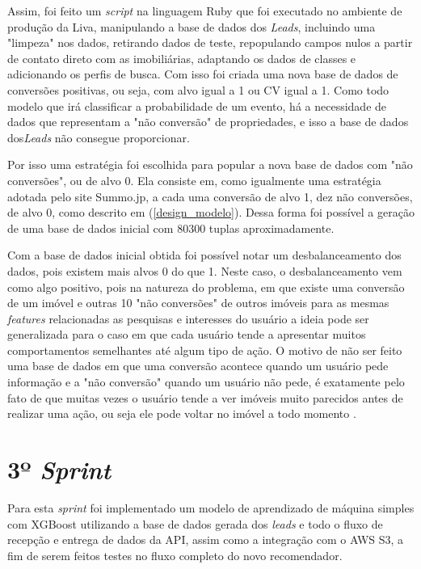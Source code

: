 Assim, foi feito um \textit{script} na linguagem Ruby que foi executado no ambiente de produção da Liva, manipulando a base de dados dos \textit{Leads}, incluindo uma "limpeza" nos dados, retirando dados de teste, repopulando campos nulos a partir de contato direto com as imobiliárias, adaptando os dados de classes e adicionando os perfis de busca. Com isso foi criada uma nova base de dados de conversões positivas, ou seja, com alvo igual a 1 ou CV igual a 1. Como todo modelo que irá classificar a probabilidade de um evento, há a necessidade de dados que representam a "não conversão" de propriedades, e isso a base de dados dos\textit{Leads} não consegue proporcionar.

Por isso uma estratégia foi escolhida para popular a nova base de dados com "não conversões", ou de alvo 0. Ela consiste em, como igualmente uma estratégia adotada pelo site Summo.jp, a cada uma conversão de alvo 1, dez não conversões, de alvo 0, como descrito em (\ref{design_modelo}). Dessa forma foi possível a geração de uma base de dados inicial com 80300 tuplas aproximadamente.

Com a base de dados inicial obtida foi possível notar um desbalanceamento dos dados, pois existem mais alvos 0 do que 1. Neste caso, o desbalanceamento vem como algo positivo, pois na natureza do problema, em que existe uma conversão de um imóvel e outras 10 "não conversões" de outros imóveis para as mesmas \textit{features} relacionadas as pesquisas e interesses do usuário a ideia pode ser generalizada para o caso em que cada usuário tende a apresentar muitos comportamentos semelhantes até algum tipo de ação. O motivo de não ser feito uma base de dados em que uma conversão acontece quando um usuário pede informação e a "não conversão" quando um usuário não pede, é exatamente pelo fato de que muitas vezes o usuário tende a ver imóveis muito parecidos antes de realizar uma ação, ou seja ele pode voltar no imóvel a todo momento \cite{Summo:2017}.


\section{3º \textit{Sprint}}

Para esta \textit{sprint} foi implementado um modelo de aprendizado de máquina simples com XGBoost utilizando a base de dados gerada dos \textit{leads} e todo o fluxo de recepção e entrega de dados da API, assim como a integração com o AWS S3, a fim de serem feitos testes no fluxo completo do novo recomendador.

